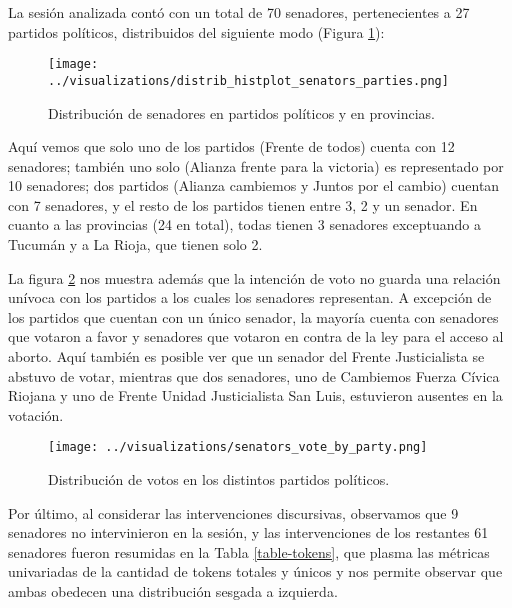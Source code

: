 La sesión analizada contó con un total de 70 senadores,
pertenecientes a 27 partidos políticos, distribuidos del
siguiente modo (Figura \ref{fig-distrib-senators}):

\begin{figure}[h!]
\centering
\texttt{[image: ../visualizations/distrib\_histplot\_senators\_parties.png]}
\caption{Distribución de senadores en partidos políticos y en provincias.}
\label{fig-distrib-senators}
\end{figure}

Aquí vemos que solo uno de los partidos (Frente de todos) cuenta con 12
senadores; también uno solo (Alianza frente para la victoria) es
representado por 10 senadores; dos partidos (Alianza cambiemos y
Juntos por el cambio) cuentan con 7 senadores, y el resto de los
partidos tienen entre 3, 2 y un senador.
En cuanto a las provincias (24 en total), todas tienen 3 senadores
exceptuando a Tucumán y a La Rioja, que tienen solo 2.

La figura \ref{fig-distrib-vote} nos muestra además que la intención
de voto no guarda una relación unívoca con los partidos a los cuales los
senadores representan. A excepción de los partidos que cuentan con un único
senador, la mayoría cuenta con senadores que votaron a favor y senadores
que votaron en contra de la ley para el acceso al aborto. Aquí también
es posible ver que un senador del Frente Justicialista se abstuvo de votar,
mientras que dos senadores, uno de Cambiemos Fuerza Cívica Riojana y uno de
Frente Unidad Justicialista San Luis, estuvieron ausentes en la votación.

\begin{figure}[h!]
\centering
\texttt{[image: ../visualizations/senators\_vote\_by\_party.png]}
\caption{Distribución de votos en los distintos partidos políticos.}
\label{fig-distrib-vote}
\end{figure}

Por último, al considerar las intervenciones discursivas, observamos que
9 senadores no intervinieron en la sesión, y las intervenciones de los
restantes 61 senadores fueron resumidas en la Tabla \ref{table-tokens}, que plasma
las métricas univariadas de la cantidad de tokens totales y únicos y nos
permite observar que ambas obedecen una distribución sesgada a izquierda.



